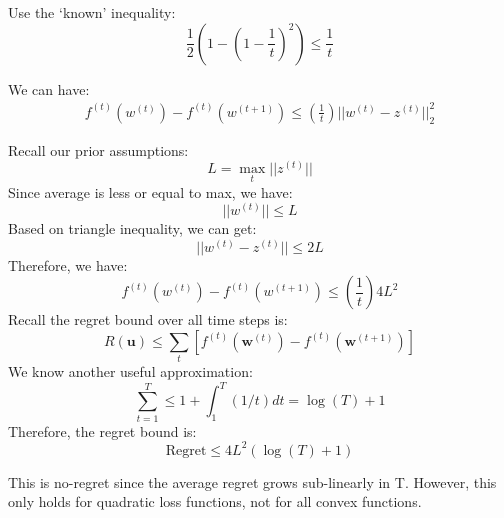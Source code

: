 \documentclass[11pt]{article}
\begin{document}
Use the `known' inequality:\\
\begin{equation*}
    \frac{1}{2}\left(1 - (1 - \frac{1}{t})^2\right) \leq \frac{1}{t}
\end{equation*}

We can have:\\
\begin{equation*}
\begin{aligned}
     f^{(t)}(w^{(t)}) - f^{(t)}(w^{(t+1)}) \leq \left(\frac{1}{t}\right)||w^{(t)} - z^{(t)}||_2^2
\end{aligned}
\end{equation*}

Recall our prior assumptions:\\
\begin{equation*}
    L = \max \limits_{t}||z^{(t)}||
\end{equation*}
Since average is less or equal to max, we have:\\
\begin{equation*}
    ||w^{(t)}|| \leq L
\end{equation*}
Based on triangle inequality, we can get:\\
\begin{equation*}
    ||w^{(t)} - z^{(t)}|| \leq 2L
\end{equation*}
Therefore, we have:\\
\begin{equation*}
    f^{(t)}(w^{(t)}) - f^{(t)}(w^{(t+1)}) \leq \left(\frac{1}{t}\right) 4L^2
\end{equation*}
Recall the regret bound over all time steps is:\\
\begin{equation*}
    R(\bm{u}) \leq \sum_{t}[f^{(t)}(\bm{w}^{(t)}) - f^{(t)}(\bm{w}^{(t+1)})] 
\end{equation*}
We know another useful approximation:\\
\begin{equation*}
    \sum_{t=1}^T \leq 1 + \int_1^T (1/t) dt = \log(T) + 1 
\end{equation*}
Therefore, the regret bound is:\\
\begin{equation*}
    \text{Regret} \leq 4L^2 \left( \log(T) + 1 \right)
\end{equation*}

This is no-regret since the average regret grows sub-linearly in T. However, this only holds for quadratic loss functions, not for all convex functions.\\
\end{document}
